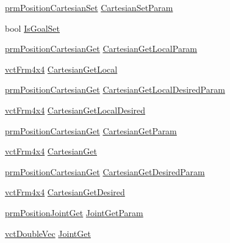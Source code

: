 \begin{DoxyCompactItemize}
\begin{tabbing}
\end{tabbing}\item 
\hyperlink{classprm_position_cartesian_set}{prm\-Position\-Cartesian\-Set} \hyperlink{classmts_intuitive_research_kit_arm_aac57cf7ee853a7eb49c166d2b466355d}{Cartesian\-Set\-Param}
\item 
bool \hyperlink{classmts_intuitive_research_kit_arm_a195a5e42ec222e5315017bc97092079a}{Is\-Goal\-Set}
\item 
\hyperlink{classprm_position_cartesian_get}{prm\-Position\-Cartesian\-Get} \hyperlink{classmts_intuitive_research_kit_arm_a5f5039081a3da8ebf6136e31cad7c6bb}{Cartesian\-Get\-Local\-Param}
\item 
\hyperlink{vct_transformation_types_8h_a33da47f4deb2556b37a69a2c44b29d75}{vct\-Frm4x4} \hyperlink{classmts_intuitive_research_kit_arm_a83b2a9ee843f449a029091f960468327}{Cartesian\-Get\-Local}
\item 
\hyperlink{classprm_position_cartesian_get}{prm\-Position\-Cartesian\-Get} \hyperlink{classmts_intuitive_research_kit_arm_acb4ee21dcb8f3a28ea8cbe61f166dbc4}{Cartesian\-Get\-Local\-Desired\-Param}
\item 
\hyperlink{vct_transformation_types_8h_a33da47f4deb2556b37a69a2c44b29d75}{vct\-Frm4x4} \hyperlink{classmts_intuitive_research_kit_arm_ab8a749ba58cf20e8ef76f5696c2c9476}{Cartesian\-Get\-Local\-Desired}
\item 
\hyperlink{classprm_position_cartesian_get}{prm\-Position\-Cartesian\-Get} \hyperlink{classmts_intuitive_research_kit_arm_aaa7f1d15ec9a20f8ed317d8139561dd7}{Cartesian\-Get\-Param}
\item 
\hyperlink{vct_transformation_types_8h_a33da47f4deb2556b37a69a2c44b29d75}{vct\-Frm4x4} \hyperlink{classmts_intuitive_research_kit_arm_a1d55346b0a151a2cb1620f073dbcc574}{Cartesian\-Get}
\item 
\hyperlink{classprm_position_cartesian_get}{prm\-Position\-Cartesian\-Get} \hyperlink{classmts_intuitive_research_kit_arm_a6b37fa3ae133f7fd9b281f4f37d55625}{Cartesian\-Get\-Desired\-Param}
\item 
\hyperlink{vct_transformation_types_8h_a33da47f4deb2556b37a69a2c44b29d75}{vct\-Frm4x4} \hyperlink{classmts_intuitive_research_kit_arm_ab05e2c95fcc34a1471801b6fa052c103}{Cartesian\-Get\-Desired}
\item 
\hyperlink{classprm_position_joint_get}{prm\-Position\-Joint\-Get} \hyperlink{classmts_intuitive_research_kit_arm_ae80cfd241b7a82e0f0f7861096c98a90}{Joint\-Get\-Param}
\item 
\hyperlink{vct_dynamic_vector_types_8h_ade4b3068c86fb88f41af2e5187e491c2}{vct\-Double\-Vec} \hyperlink{classmts_intuitive_research_kit_arm_a6e083406ccebe49d0a6f7991a3f227ca}{Joint\-Get}

\end{DoxyCompactItemize}
